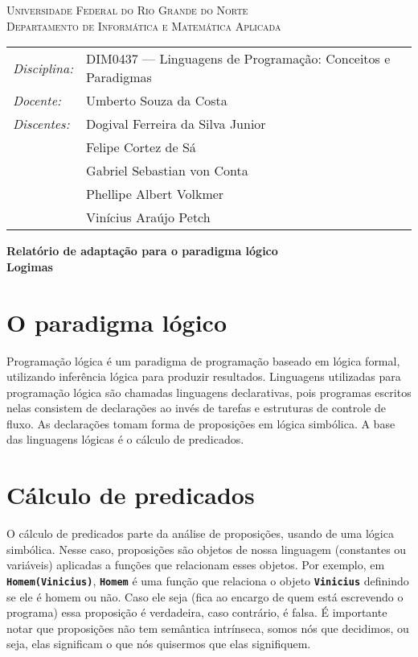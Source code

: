 \documentclass[12pt, a4paper]{article}
\newcommand{\inlinecode}[1]{\textbf{\lstinline{#1}}}
\begin{document}
\begin{center}
    \textsc{Universidade Federal do Rio Grande do Norte} \\
    \textsc{Departamento de Informática e Matemática Aplicada}
\end{center}

\bigskip

\begin{tabular}{@{}ll@{}}
    \emph{Disciplina:} & DIM0437 --- Linguagens de Programação:
                            Conceitos e Paradigmas \\
    \emph{Docente:}    & Umberto Souza da Costa \\
    \emph{Discentes:}  & Dogival Ferreira da Silva Junior \\
                       & Felipe Cortez de Sá \\
                       & Gabriel Sebastian von Conta \\
                       & Phellipe Albert Volkmer \\
                       & Vinícius Araújo Petch
\end{tabular}

\bigskip

\begin{center}
\large \textbf{Relatório de adaptação para o paradigma lógico \\ Logimas}
\end{center}

\bigskip

\section{O paradigma lógico}
Programação lógica é um paradigma de programação baseado em lógica
formal, utilizando inferência lógica para produzir resultados.
Linguagens utilizadas para programação lógica são chamadas linguagens
declarativas, pois programas escritos nelas consistem de declarações ao
invés de tarefas e estruturas de controle de fluxo. As declarações
tomam forma de proposições em lógica simbólica. A base das linguagens
lógicas é o cálculo de predicados.

\section{Cálculo de predicados}
O cálculo de predicados parte da análise de proposições, usando de uma
lógica simbólica. Nesse caso, proposições são objetos de nossa
linguagem (constantes ou variáveis) aplicadas a funções que relacionam
esses objetos. Por exemplo, em \inlinecode{Homem(Vinicius)},
\inlinecode{Homem} é uma função que relaciona o objeto
\inlinecode{Vinicius} definindo se ele é homem ou não. Caso ele seja
(fica ao encargo de quem está escrevendo o programa) essa proposição é
verdadeira, caso contrário, é falsa. É importante notar que proposições
não tem semântica intrínseca, somos nós que decidimos, ou seja, elas
significam o que nós quisermos que elas signifiquem.
\end{document}
